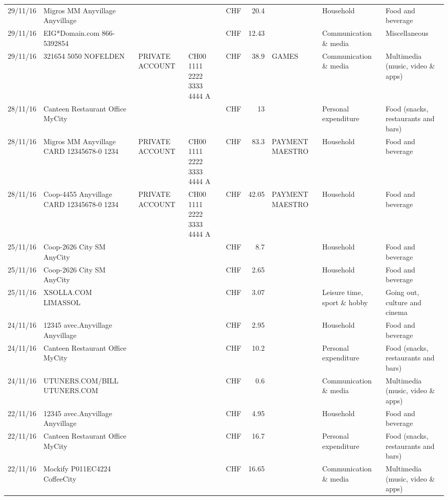 \begin{landscape}
\begin{table}[h]
\begin{center}
\begin{tabular}{rllllrlll}
		29/11/16 & Migros MM Anyvillage    Anyvillage &       &       & CHF   & 20.4  &       & Household & Food and beverage \\
		29/11/16 & EIG*Domain.com           866-5392854 &       &       & CHF   & 12.43 &       & Communication \& media & Miscellaneous \\
		29/11/16 & 321654 5050 NOFELDEN & PRIVATE ACCOUNT & CH00 1111 2222 3333 4444 A & CHF   & 38.9  & GAMES & Communication \& media & Multimedia (music, video \& apps) \\
		28/11/16 & Canteen Restaurant Office      MyCity &       &       & CHF   & 13    &       & Personal expenditure & Food (snacks, restaurants and bars) \\
		28/11/16 & Migros MM Anyvillage CARD 12345678-0 1234 & PRIVATE ACCOUNT & CH00 1111 2222 3333 4444 A & CHF   & 83.3  & PAYMENT MAESTRO & Household & Food and beverage \\
		28/11/16 & Coop-4455 Anyvillage CARD 12345678-0 1234 & PRIVATE ACCOUNT & CH00 1111 2222 3333 4444 A & CHF   & 42.05 & PAYMENT MAESTRO & Household & Food and beverage \\
		25/11/16 & Coop-2626 City SM        AnyCity &       &       & CHF   & 8.7   &       & Household & Food and beverage \\
		25/11/16 & Coop-2626 City SM        AnyCity &       &       & CHF   & 2.65  &       & Household & Food and beverage \\
		25/11/16 & XSOLLA.COM               LIMASSOL &       &       & CHF   & 3.07  &       & Leisure time, sport \& hobby & Going out, culture and cinema \\
		24/11/16 & 12345 avec.Anyvillage   Anyvillage &       &       & CHF   & 2.95  &       & Household & Food and beverage \\
		24/11/16 & Canteen Restaurant Office      MyCity &       &       & CHF   & 10.2  &       & Personal expenditure & Food (snacks, restaurants and bars) \\
		24/11/16 & UTUNERS.COM/BILL          UTUNERS.COM &       &       & CHF   & 0.6   &       & Communication \& media & Multimedia (music, video \& apps) \\
		22/11/16 & 12345 avec.Anyvillage   Anyvillage &       &       & CHF   & 4.95  &       & Household & Food and beverage \\
		22/11/16 & Canteen Restaurant Office      MyCity &       &       & CHF   & 16.7  &       & Personal expenditure & Food (snacks, restaurants and bars) \\
		22/11/16 & Mockify P011EC4224       CoffeeCity &       &       & CHF   & 16.65 &       & Communication \& media & Multimedia (music, video \& apps) \\

\end{tabular}
\end{center}
\end{table}
\end{landscape}
